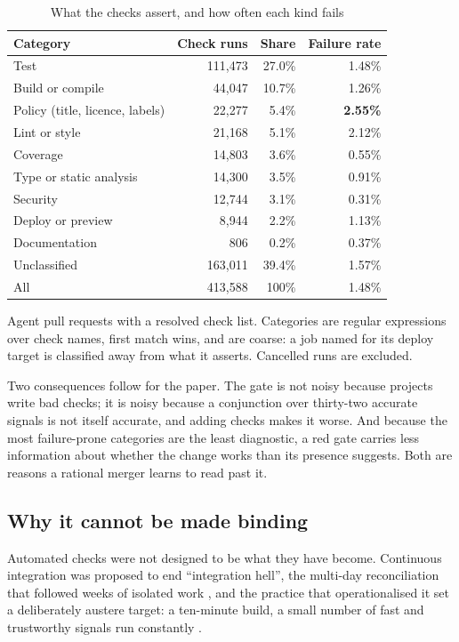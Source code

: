 \documentclass[mnsc]{informs4}
\begin{document}
\begin{table}[t]
\caption{What the checks assert, and how often each kind fails}
\label{tab:checks}
\centering\small
\begin{tabular}{lrrr}
\toprule
Category & Check runs & Share & Failure rate \\
\midrule
Test & 111,473 & 27.0\% & 1.48\% \\
Build or compile & 44,047 & 10.7\% & 1.26\% \\
Policy (title, licence, labels) & 22,277 & 5.4\% & \textbf{2.55\%} \\
Lint or style & 21,168 & 5.1\% & 2.12\% \\
Coverage & 14,803 & 3.6\% & 0.55\% \\
Type or static analysis & 14,300 & 3.5\% & 0.91\% \\
Security & 12,744 & 3.1\% & 0.31\% \\
Deploy or preview & 8,944 & 2.2\% & 1.13\% \\
Documentation & 806 & 0.2\% & 0.37\% \\
Unclassified & 163,011 & 39.4\% & 1.57\% \\
\midrule
All & 413,588 & 100\% & 1.48\% \\
\bottomrule
\end{tabular}
\par\vspace{2pt}
\footnotesize Agent pull requests with a resolved check list. Categories are
regular expressions over check names, first match wins, and are coarse: a job
named for its deploy target is classified away from what it asserts. Cancelled
runs are excluded.
\end{table}

Two consequences follow for the paper. The gate is not noisy because projects
write bad checks; it is noisy because a conjunction over thirty-two accurate
signals is not itself accurate, and adding checks makes it worse. And because the
most failure-prone categories are the least diagnostic, a red gate carries less
information about whether the change works than its presence suggests. Both are
reasons a rational merger learns to read past it.

\subsection{Why it cannot be made binding}

Automated checks were not designed to be what they have become. Continuous
integration was proposed to end ``integration hell'', the multi-day reconciliation
that followed weeks of isolated work \citep{booch1994ooad}, and the practice that
operationalised it set a deliberately austere target: a ten-minute build, a small
number of fast and trustworthy signals run constantly \citep{beck2000xp}.
\end{document}
